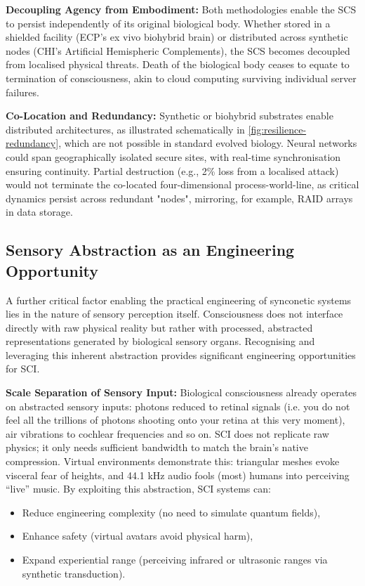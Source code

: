 \documentclass[10pt]{article}
\begin{document}
\begin{sloppypar}
  \textbf{Decoupling Agency from Embodiment:} Both methodologies enable the SCS to persist independently of its original biological body. Whether stored in a shielded facility (ECP’s ex vivo biohybrid brain) or distributed across synthetic nodes (CHI’s Artificial Hemispheric Complements), the SCS becomes decoupled from localised physical threats. Death of the biological body ceases to equate to termination of consciousness, akin to cloud computing surviving individual server failures.

  \textbf{Co-Location and Redundancy:} Synthetic or biohybrid substrates enable distributed architectures, as illustrated schematically in \autoref{fig:resilience-redundancy}, which are not possible in standard evolved biology. Neural networks could span geographically isolated secure sites, with real-time synchronisation ensuring continuity. Partial destruction (e.g., 2\% loss from a localised attack) would not terminate the co-located four-dimensional process-world-line, as critical dynamics persist across redundant "nodes", mirroring, for example, RAID arrays in data storage.

  \subsection{Sensory Abstraction as an Engineering Opportunity}
  \label{sec:sensory-abstraction}

  A further critical factor enabling the practical engineering of synconetic systems lies in the nature of sensory perception itself. Consciousness does not interface directly with raw physical reality but rather with processed, abstracted representations generated by biological sensory organs. Recognising and leveraging this inherent abstraction provides significant engineering opportunities for SCI.

  \textbf{Scale Separation of Sensory Input:} Biological consciousness already operates on abstracted sensory inputs: photons reduced to retinal signals (i.e. you do not feel all the trillions of photons shooting onto your retina at this very moment), air vibrations to cochlear frequencies and so on. SCI does not replicate raw physics; it only needs sufficient bandwidth to match the brain’s native compression. Virtual environments demonstrate this: triangular meshes evoke visceral fear of heights, and 44.1 kHz audio fools (most) humans into perceiving “live” music. By exploiting this abstraction, SCI systems can:

  \begin{itemize}
    \item Reduce engineering complexity (no need to simulate quantum fields),
    \item Enhance safety (virtual avatars avoid physical harm),
    \item Expand experiential range (perceiving infrared or ultrasonic ranges via synthetic transduction).
  \end{itemize}


\end{sloppypar}
\end{document}
